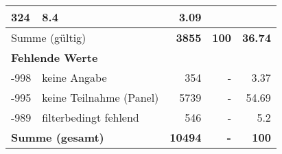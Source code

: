\begin{longtable}{lXrrr}
       \num{324} &
       \num[round-mode=places,round-precision=2]{8.4} &
         \num[round-mode=places,round-precision=2]{3.09} \\
     \midrule
     \multicolumn{2}{l}{Summe (gültig)} &
       \textbf{\num{3855}} &
     \textbf{\num{100}} &
       \textbf{\num[round-mode=places,round-precision=2]{36.74}} \\
     \multicolumn{5}{l}{\textbf{Fehlende Werte}}\\
       -998 &
       keine Angabe &
         \num{354} &
        - &
         \num[round-mode=places,round-precision=2]{3.37} \\
       -995 &
       keine Teilnahme (Panel) &
         \num{5739} &
        - &
         \num[round-mode=places,round-precision=2]{54.69} \\
       -989 &
       filterbedingt fehlend &
         \num{546} &
        - &
         \num[round-mode=places,round-precision=2]{5.2} \\
     \midrule
     \multicolumn{2}{l}{\textbf{Summe (gesamt)}} &
          \textbf{\num{10494}} &
        \textbf{-} &
        \textbf{\num{100}} \\
     \bottomrule
     \end{longtable}
     
